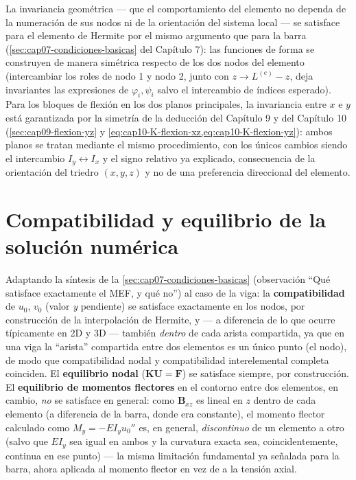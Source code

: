 La invariancia geométrica --- que el comportamiento del elemento no dependa de la numeración de sus nodos ni de la orientación del sistema local --- se satisface para el elemento de Hermite por el mismo argumento que para la barra (\cref{sec:cap07-condiciones-basicas} del Capítulo 7): las funciones de forma se construyen de manera simétrica respecto de los dos nodos del elemento (intercambiar los roles de nodo 1 y nodo 2, junto con $z\to L^{(e)}-z$, deja invariantes las expresiones de $\varphi_i,\psi_i$ salvo el intercambio de índices esperado). Para los bloques de flexión en los dos planos principales, la invariancia entre $x$ e $y$ está garantizada por la simetría de la deducción del Capítulo 9 y del Capítulo 10 (\cref{sec:cap09-flexion-yz} y \cref{eq:cap10-K-flexion-xz,eq:cap10-K-flexion-yz}): ambos planos se tratan mediante el mismo procedimiento, con los únicos cambios siendo el intercambio $I_y\leftrightarrow I_x$ y el signo relativo ya explicado, consecuencia de la orientación del triedro $(x,y,z)$ y no de una preferencia direccional del elemento.

\section{Compatibilidad y equilibrio de la solución numérica}

\begin{observacion}
Adaptando la síntesis de la \cref{sec:cap07-condiciones-basicas} (observación ``Qué satisface exactamente el MEF, y qué no'') al caso de la viga: la \textbf{compatibilidad} de $u_0$, $v_0$ (valor \emph{y} pendiente) se satisface exactamente en los nodos, por construcción de la interpolación de Hermite, y --- a diferencia de lo que ocurre típicamente en 2D y 3D --- también \emph{dentro} de cada arista compartida, ya que en una viga la ``arista'' compartida entre dos elementos es un único punto (el nodo), de modo que compatibilidad nodal y compatibilidad interelemental completa coinciden. El \textbf{equilibrio nodal} ($\bm K\bm U=\bm F$) se satisface siempre, por construcción. El \textbf{equilibrio de momentos flectores} en el contorno entre dos elementos, en cambio, \emph{no} se satisface en general: como $\bm B_{xz}$ es lineal en $z$ dentro de cada elemento (a diferencia de la barra, donde era constante), el momento flector calculado como $M_y=-EI_y u_0''$ es, en general, \emph{discontinuo} de un elemento a otro (salvo que $EI_y$ sea igual en ambos y la curvatura exacta sea, coincidentemente, continua en ese punto) --- la misma limitación fundamental ya señalada para la barra, ahora aplicada al momento flector en vez de a la tensión axial.
\end{observacion}

